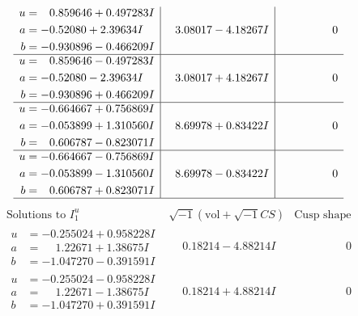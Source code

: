 \documentclass[1p]{elsarticle_modified}
\theoremstyle{definition}
\newcommand{\I}{\sqrt{-1}}
\begin{document}
$$\begin{array}{c|c|c}
\begin{aligned}
u &= \phantom{-}0.859646 + 0.497283 I \\
a &= -0.52080 + 2.39634 I \\
b &= -0.930896 - 0.466209 I\end{aligned}
 & \phantom{-}3.08017 - 4.18267 I & \phantom{-0.000000 } 0 \\ \hline\begin{aligned}
u &= \phantom{-}0.859646 - 0.497283 I \\
a &= -0.52080 - 2.39634 I \\
b &= -0.930896 + 0.466209 I\end{aligned}
 & \phantom{-}3.08017 + 4.18267 I & \phantom{-0.000000 } 0 \\ \hline\begin{aligned}
u &= -0.664667 + 0.756869 I \\
a &= -0.053899 + 1.310560 I \\
b &= \phantom{-}0.606787 - 0.823071 I\end{aligned}
 & \phantom{-}8.69978 + 0.83422 I & \phantom{-0.000000 } 0 \\ \hline\begin{aligned}
u &= -0.664667 - 0.756869 I \\
a &= -0.053899 - 1.310560 I \\
b &= \phantom{-}0.606787 + 0.823071 I\end{aligned}
 & \phantom{-}8.69978 - 0.83422 I & \phantom{-0.000000 } 0\\
 \hline 
 \end{array}$$\newpage$$\begin{array}{c|c|c}  
\text{Solutions to }I^u_{1}& \I (\text{vol} + \sqrt{-1}CS) & \text{Cusp shape}\\
 \hline 
\begin{aligned}
u &= -0.255024 + 0.958228 I \\
a &= \phantom{-}1.22671 + 1.38675 I \\
b &= -1.047270 - 0.391591 I\end{aligned}
 & \phantom{-}0.18214 - 4.88214 I & \phantom{-0.000000 } 0 \\ \hline\begin{aligned}
u &= -0.255024 - 0.958228 I \\
a &= \phantom{-}1.22671 - 1.38675 I \\
b &= -1.047270 + 0.391591 I\end{aligned}
 & \phantom{-}0.18214 + 4.88214 I & \phantom{-0.000000 } 0 \\ \hline\begin{aligned}

\end{aligned}
\end{array}$$
\end{document}
